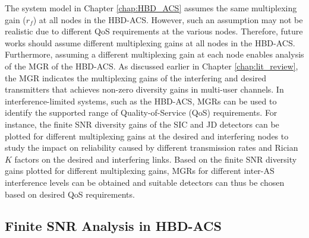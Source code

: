 The system model in Chapter \ref{chap:HBD_ACS} assumes the same multiplexing gain ($r_f$) at all nodes in the HBD-ACS. However, such an assumption may not be realistic due to different QoS requirements at the various nodes. Therefore, future works should assume different multiplexing gains at all nodes in the HBD-ACS. Furthermore, assuming a different multiplexing gain at each node enables analysis of the MGR of the HBD-ACS. As discussed earlier in Chapter \ref{chap:lit_review}, the MGR indicates the multiplexing gains of the interfering and desired transmitters that achieves non-zero diversity gains in multi-user channels. In interference-limited systems, such as the HBD-ACS, MGRs can be used to identify the supported range of Quality-of-Service (QoS) requirements. For instance, the finite SNR diversity gains of the SIC and JD detectors can be plotted for different multiplexing gains at the desired and interfering nodes to study the impact on reliability caused by different transmission rates and Rician $K$ factors on the desired and interfering links. Based on the finite SNR diversity gains plotted for different multiplexing gains, MGRs for different inter-AS interference levels can be obtained and suitable detectors can thus be chosen based on desired QoS requirements.



\subsection{Finite SNR Analysis in HBD-ACS}

